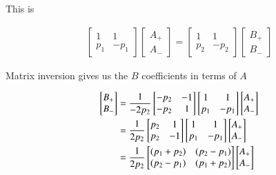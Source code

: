 This is

\begin{align*}
\begin{bmatrix}
1 & 1 \\
p_1 & -p_1
\end{bmatrix}
\begin{bmatrix}
A_{+} \\
A_{-}
\end{bmatrix}
=
\begin{bmatrix}
1 & 1 \\
p_2 & -p_2
\end{bmatrix}
\begin{bmatrix}
B_{+} \\
B_{-}
\end{bmatrix}
\end{align*}

Matrix inversion gives us the $B$ coefficients in terms of $A$

\begin{align*}
\begin{bmatrix}
B_{+} \\
B_{-}
\end{bmatrix}
&=
\frac{1}{-2p_2}
\begin{bmatrix}
-p_2 & -1 \\
-p_2 & 1
\end{bmatrix}
\begin{bmatrix}
1 & 1 \\
p_1 & -p_1
\end{bmatrix}
\begin{bmatrix}
A_{+} \\
A_{-}
\end{bmatrix} \\
&=
\frac{1}{2p_2}
\begin{bmatrix}
p_2 & 1 \\
p_2 & -1
\end{bmatrix}
\begin{bmatrix}
1 & 1 \\
p_1 & -p_1
\end{bmatrix}
\begin{bmatrix}
A_{+} \\
A_{-}
\end{bmatrix} \\
&=
\frac{1}{2p_2}
\begin{bmatrix}
(p_1 + p_2) & (p_2 - p_1) \\
(p_2 - p_1) & (p_1 + p_2)
\end{bmatrix}
\begin{bmatrix}
A_{+} \\
A_{-}
\end{bmatrix} \\
\end{align*}

